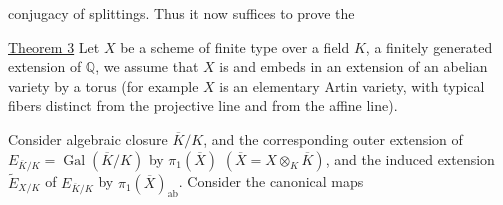 conjugacy of splittings. Thus it now suffices to prove the

\uline{Theorem 3} Let $X$ be a scheme of finite type over a field $K$, a finitely generated extension of $\mathbb Q$, we assume that $X$ is   and embeds in an extension of an abelian variety by a torus (for example $X$ is an elementary Artin variety, with typical fibers  distinct from the projective line and from the affine line).


Consider   algebraic closure $\overline K/K$, and  the corresponding outer extension  of $E_{\overline K/K}=\operatorname{Gal}(\overline K/K)$ by $\pi_1(\overline X)$ $(\overline X=X\otimes_K\overline K)$, and the induced extension $\widetilde E_{X/K}$ of $E_{\overline K/K}$ by $\pi_1(\overline X)_{\mathrm{ab}}$. Consider the canonical maps
